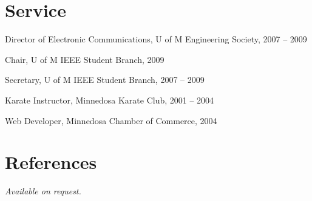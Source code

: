 \documentclass[margin,line,letterpaper]{resume}
\begin{document}
\begin{resume}
  \section{\mysidestyle Service}

  \begin{list2}
    \item Director of Electronic Communications, U of M Engineering Society, 2007 -- 2009
    \item Chair, U of M IEEE Student Branch, 2009
    \item Secretary, U of M IEEE Student Branch, 2007 -- 2009
    \item Karate Instructor, Minnedosa Karate Club, 2001 -- 2004
    \item Web Developer, Minnedosa Chamber of Commerce, 2004
  \end{list2}

  \section{\mysidestyle References}

  {\sl Available on request.}

\end{resume}
\end{document}
